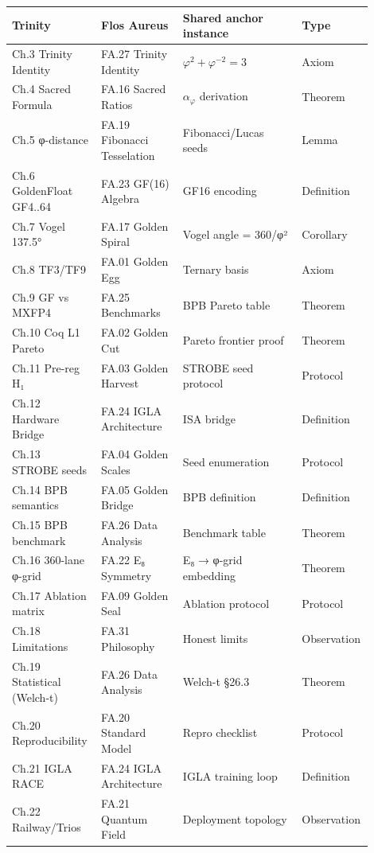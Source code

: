 {\small
\begin{longtable}{@{}p{0.24\linewidth}p{0.22\linewidth}p{0.32\linewidth}p{0.12\linewidth}@{}}
\toprule
\textbf{Trinity} & \textbf{Flos Aureus} & \textbf{Shared anchor instance} & \textbf{Type} \\
\midrule
\endhead
Ch.3 Trinity Identity & FA.27 Trinity Identity & $\varphi^2+\varphi^{-2}=3$ & Axiom \\
Ch.4 Sacred Formula & FA.16 Sacred Ratios & $\alpha_\varphi$ derivation & Theorem \\
Ch.5 φ-distance & FA.19 Fibonacci Tesselation & Fibonacci/Lucas seeds & Lemma \\
Ch.6 GoldenFloat GF4..64 & FA.23 GF(16) Algebra & GF16 encoding & Definition \\
Ch.7 Vogel 137.5° & FA.17 Golden Spiral & Vogel angle = 360/φ² & Corollary \\
Ch.8 TF3/TF9 & FA.01 Golden Egg & Ternary basis & Axiom \\
Ch.9 GF vs MXFP4 & FA.25 Benchmarks & BPB Pareto table & Theorem \\
Ch.10 Coq L1 Pareto & FA.02 Golden Cut & Pareto frontier proof & Theorem \\
Ch.11 Pre-reg H₁ & FA.03 Golden Harvest & STROBE seed protocol & Protocol \\
Ch.12 Hardware Bridge & FA.24 IGLA Architecture & ISA bridge & Definition \\
Ch.13 STROBE seeds & FA.04 Golden Scales & Seed enumeration & Protocol \\
Ch.14 BPB semantics & FA.05 Golden Bridge & BPB definition & Definition \\
Ch.15 BPB benchmark & FA.26 Data Analysis & Benchmark table & Theorem \\
Ch.16 360-lane φ-grid & FA.22 E₈ Symmetry & E₈ → φ-grid embedding & Theorem \\
Ch.17 Ablation matrix & FA.09 Golden Seal & Ablation protocol & Protocol \\
Ch.18 Limitations & FA.31 Philosophy & Honest limits & Observation \\
Ch.19 Statistical (Welch-t) & FA.26 Data Analysis & Welch-t §26.3 & Theorem \\
Ch.20 Reproducibility & FA.20 Standard Model & Repro checklist & Protocol \\
Ch.21 IGLA RACE & FA.24 IGLA Architecture & IGLA training loop & Definition \\
Ch.22 Railway/Trios & FA.21 Quantum Field & Deployment topology & Observation \\

\end{longtable}}
